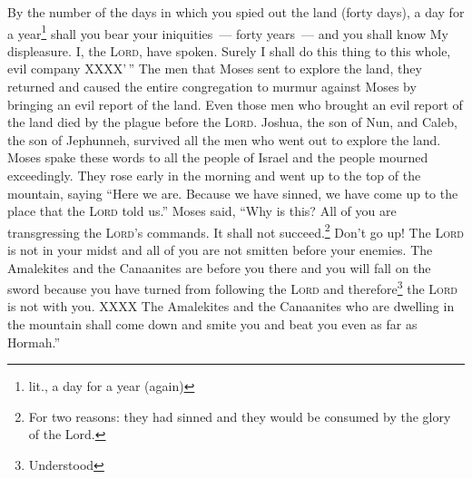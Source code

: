 \begin{enumerate}[align=center]
     By the number of the days in which you spied out the land (forty days), a day for a year\footnote{lit., a day for a year (again)} shall you bear your iniquities~--- forty years~--- and you shall know My displeasure.%
     I, the \textsc{Lord}, have spoken. Surely I shall do this thing to this whole, evil company XXXX'\,''%
     The men that Moses sent to explore the land, they returned and caused the entire congregation to murmur against Moses by bringing an evil report of the land.%
     Even those men who brought an evil report of the land died by the plague before the \textsc{Lord}.%
     Joshua, the son of Nun, and Caleb, the son of Jephunneh, survived all the men who went out to explore the land.%
     Moses spake these words to all the people of Israel and the people mourned exceedingly.%
     They rose early in the morning and went up to the top of the mountain, saying ``Here we are. Because we have sinned, we have come up to the place that the \textsc{Lord} told us.''%
     Moses said, ``Why is this? All of you are transgressing the \textsc{Lord}'s commands. It shall not succeed.\footnote{For two reasons: they had sinned and they would be consumed by the glory of the Lord.}%
     Don't go up! The \textsc{Lord} is not in your midst and all of you are not smitten before your enemies.%
     The Amalekites and the Canaanites are before you there and you will fall on the sword because you have turned from following the \textsc{Lord} and therefore\footnote{Understood} the \textsc{Lord} is not with you.%
     XXXX%
     The Amalekites and the Canaanites who are dwelling in the mountain shall come down and smite you and beat you even as far as Hormah.''%
\end{enumerate}

